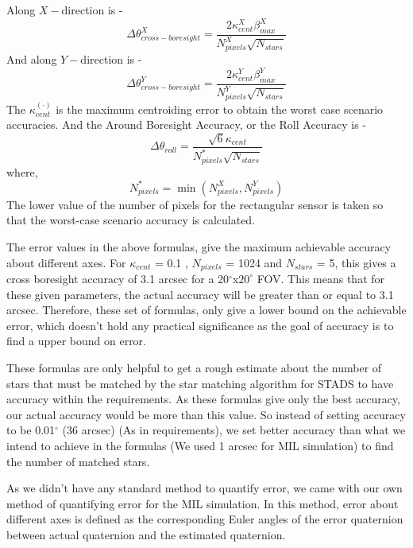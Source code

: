 \documentclass[../../main.tex]{subfiles}
\begin{document}
{{Along $X -$direction is -
\begin{equation}
    \Delta \theta_{cross-boresight}^X = \frac{2 \kappa_{cent}^X \beta_{max}^X}{N_{pixels}^X \sqrt{N_{stars}}}
\end{equation}
And along $Y -$direction is -
\begin{equation}
    \Delta \theta_{cross-boresight}^Y = \frac{2 \kappa_{cent}^Y \beta_{max}^Y}{N_{pixels}^Y \sqrt{N_{stars}}}
\end{equation}
The $\kappa_{cent}^{(\cdot)}$ is the maximum centroiding error to obtain the worst case scenario accuracies.
And the Around Boresight Accuracy, or the Roll Accuracy is -
\begin{equation}
    \Delta \theta_{roll} = \frac{\sqrt{6} \kappa_{cent}}{N_{pixels}^* \sqrt{N_{stars}}}
\end{equation}
where,
\begin{equation*}
    N_{pixels}^* = \min\left( N_{pixels}^X, N_{pixels}^Y\right)
\end{equation*}
The lower value of the number of pixels for the rectangular sensor is taken so that the worst-case scenario accuracy is calculated.

The error values in the above formulas, give the maximum achievable accuracy about different axes. For $\kappa_{cent}$ = 0.1 , $N_{pixels}$ = 1024 and $N_{stars}$ = 5, this gives a cross boresight accuracy of 3.1 arcsec for a 20$^\circ$x$20^\circ$ FOV. This means that for these given parameters, the actual accuracy will be greater than or equal to 3.1 arcsec.
Therefore, these set of formulas, only give a lower bound on the achievable error, which doesn't hold any practical significance as the goal of accuracy is to find a upper bound on error. 

These formulas are only helpful to get a rough estimate about the number of stars that must be matched by the star matching algorithm for STADS to have accuracy within the requirements. As these formulas give only the best accuracy, our actual accuracy would be more than this value. So instead of setting accuracy to be 0.01$^\circ$ (36 arcsec) (As in requirements), we set better accuracy than what we intend to achieve in the formulas (We used 1 arcsec for MIL simulation) to find the number of matched stars.

As we didn't have any standard method to quantify error, we came with our own method of quantifying error for the MIL simulation. In this method, error about different axes is defined as the corresponding Euler angles of the error quaternion between actual quaternion and the estimated quaternion.

}}
\end{document}
